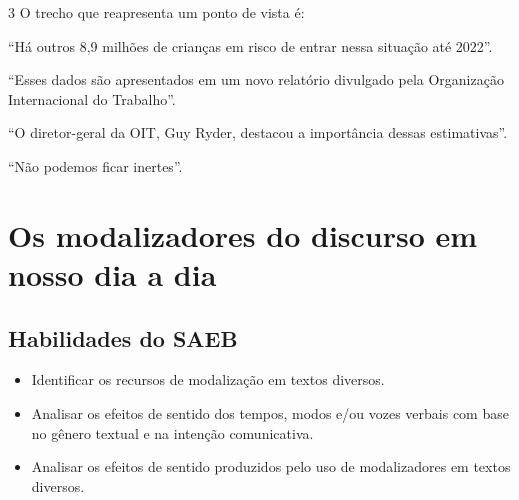 \num{3} O trecho que reapresenta um ponto de vista é:
\enlargethispage{2\baselineskip}

\begin{escolha}
\item ``Há outros 8,9 milhões de crianças em risco de entrar nessa situação
até 2022''.
\item ``Esses dados são apresentados em um novo relatório divulgado pela
Organização Internacional do Trabalho''.
\item ``O diretor-geral da OIT, Guy Ryder, destacou a importância dessas
estimativas''.
\item ``Não podemos ficar inertes''.
\end{escolha}




\chapter{Os modalizadores do discurso em nosso dia a dia}

\section*{Habilidades do SAEB}
\begin{itemize}
\item Identificar os recursos de modalização em textos
diversos. 
\item Analisar os efeitos de sentido dos tempos, modos e/ou vozes
verbais com base no gênero textual e na intenção comunicativa.
\item Analisar os efeitos de sentido produzidos pelo uso de modalizadores em
textos diversos.
\end{itemize}

